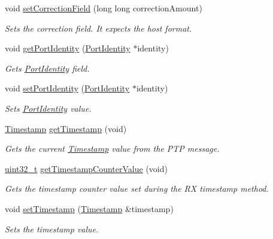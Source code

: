 \begin{DoxyCompactItemize}
void \hyperlink{class_p_t_p_message_common_acecb3e9987905070c3e9d089bae8e70d}{set\+Correction\+Field} (long long correction\+Amount)
\begin{DoxyCompactList}\small\item\em Sets the correction field. It expects the host format. \end{DoxyCompactList}\item 
void \hyperlink{class_p_t_p_message_common_a81caf27b0bcf771cb3c35d8fe42ae8ed}{get\+Port\+Identity} (\hyperlink{class_port_identity}{Port\+Identity} $\ast$identity)
\begin{DoxyCompactList}\small\item\em Gets \hyperlink{class_port_identity}{Port\+Identity} field. \end{DoxyCompactList}\item 
void \hyperlink{class_p_t_p_message_common_a94378ebb164e2095d3a17b393a63f2dc}{set\+Port\+Identity} (\hyperlink{class_port_identity}{Port\+Identity} $\ast$identity)
\begin{DoxyCompactList}\small\item\em Sets \hyperlink{class_port_identity}{Port\+Identity} value. \end{DoxyCompactList}\item 
\hyperlink{class_timestamp}{Timestamp} \hyperlink{class_p_t_p_message_common_a0bdaf174c565b4d10499011885dde906}{get\+Timestamp} (void)
\begin{DoxyCompactList}\small\item\em Gets the current \hyperlink{class_timestamp}{Timestamp} value from the P\+TP message. \end{DoxyCompactList}\item 
\hyperlink{parse_8c_a6eb1e68cc391dd753bc8ce896dbb8315}{uint32\+\_\+t} \hyperlink{class_p_t_p_message_common_a2f9298443285c8dd689acce23b59dc8f}{get\+Timestamp\+Counter\+Value} (void)
\begin{DoxyCompactList}\small\item\em Gets the timestamp counter value set during the RX timestamp method. \end{DoxyCompactList}\item 
void \hyperlink{class_p_t_p_message_common_aa35baf97ba1690eb11defa05a40f7d05}{set\+Timestamp} (\hyperlink{class_timestamp}{Timestamp} \&timestamp)
\begin{DoxyCompactList}\small\item\em Sets the timestamp value. \end{DoxyCompactList}\item 

\end{DoxyCompactItemize}
